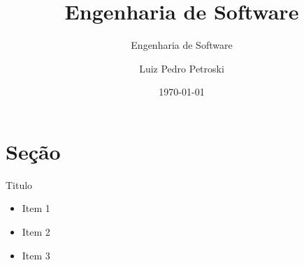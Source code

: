 \documentclass{beamer}
\title[Aula B01A01]{Engenharia de Software}
\subtitle{Engenharia de Software}
\author{Luiz Pedro Petroski}
\date{\today}
\institute{\url{petroskilp@gmail.com}}
\theoremstyle{definition} \newtheorem{teorema}{Teorema}
\theoremstyle{definition} \newtheorem{definicao}{Definição}
\theoremstyle{plain} \newtheorem{corolario}[teorema]{Corolário}
\theoremstyle{remark} \newtheorem{nota}{Nota}[section]
\begin{document}
\begin{frame}[plain,t]
\titlepage
\end{frame}
\section{Seção}
\begin{frame}{Titulo}
	\begin{itemize}
		\item Item 1
		\item Item 2
		\item Item 3
	\end{itemize}
\end{frame}



\ThankYouFrame
\end{document}
